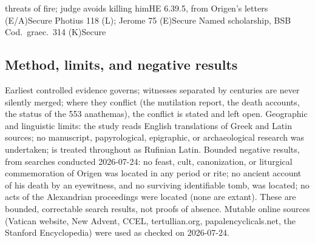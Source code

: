 \begin{lifetimeline}
{threats of fire; judge avoids killing him}{HE 6.39.5, from Origen's letters
(E/A)}{Secure}
{Photius 118 (L); Jerome 75 (E)}{Secure}
{Named scholarship, BSB Cod.\ graec.\ 314 (K)}{Secure}
\end{lifetimeline}

\subsection{Method, limits, and negative results}

Earliest controlled evidence governs; witnesses separated by centuries are
never silently merged; where they conflict (the mutilation report, the
death accounts, the status of the 553 anathemas), the conflict is stated
and left open. Geographic and linguistic limits: the study reads English
translations of Greek and Latin sources; no manuscript, papyrological,
epigraphic, or archaeological research was undertaken;  is treated throughout as Rufinian Latin. Bounded negative
results, from searches conducted 2026-07-24: no feast, cult, canonization,
or liturgical commemoration of Origen was located in any period or rite;
no ancient account of his death by an eyewitness, and no surviving
identifiable tomb, was located; no acts of the Alexandrian proceedings
were located (none are extant). These are bounded, correctable search
results, not proofs of absence. Mutable online sources (Vatican website,
New Advent, CCEL, tertullian.org, papalencyclicals.net, the Stanford
Encyclopedia) were used as checked on 2026-07-24.

